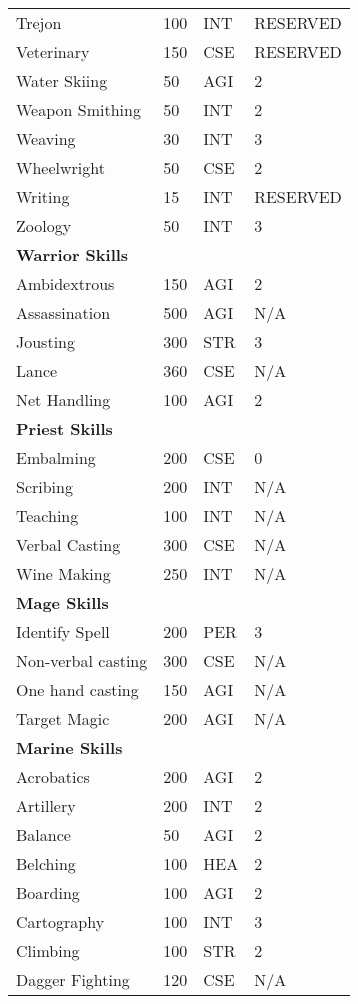 \begin{normbox}
\begin{tabularx}{\linewidth}{@{} l X X X }
Trejon & 100 & INT & RESERVED \\
Veterinary & 150 & CSE & RESERVED \\
Water Skiing & 50 & AGI & 2 \\
Weapon Smithing & 50 & INT & 2 \\
Weaving & 30 & INT & 3 \\
Wheelwright & 50 & CSE & 2 \\
Writing & 15 & INT & RESERVED \\
Zoology & 50 & INT & 3 \\
\midrule
\textbf{Warrior Skills} &  &  & \\
Ambidextrous & 150 & AGI & 2 \\
Assassination & 500 & AGI & N/A \\
Jousting & 300 & STR & 3 \\
Lance & 360 & CSE & N/A \\
Net Handling & 100 & AGI & 2 \\
\midrule
\textbf{Priest Skills} &  &  & \\
Embalming & 200 & CSE & 0 \\
Scribing & 200 & INT & N/A \\
Teaching & 100 & INT & N/A \\
Verbal Casting & 300 & CSE & N/A \\
Wine Making & 250 & INT & N/A \\
\midrule
\textbf{Mage Skills} &  &  & \\
Identify Spell & 200 & PER & 3 \\
Non-verbal casting & 300 & CSE & N/A \\
One hand casting & 150 & AGI & N/A \\
Target Magic & 200 & AGI & N/A \\
\midrule
\textbf{Marine Skills} &  &  & \\
Acrobatics & 200 & AGI & 2 \\
Artillery & 200 & INT & 2 \\
Balance & 50 & AGI & 2 \\
Belching & 100 & HEA & 2 \\
Boarding & 100 & AGI & 2 \\
Cartography & 100 & INT & 3 \\
Climbing & 100 & STR & 2 \\
Dagger Fighting & 120 & CSE & N/A \\

\end{tabularx}
\end{normbox}
